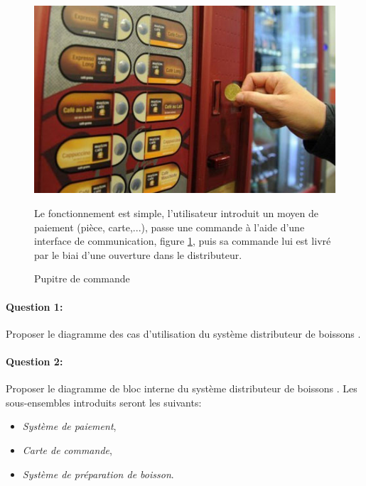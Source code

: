 \begin{figure}[htbp]
\begin{minipage}[c]{.40\linewidth}
\begin{center}
\includegraphics[width=0.9\linewidth]{img/piece.jpg}
\caption{Pupitre de commande}
\label{fig:image107}
\end{center}
\end{minipage}
\hfill
\begin{minipage}[c]{.55\linewidth}
Le fonctionnement est simple, l'utilisateur introduit un moyen de paiement (pièce, carte,...), passe une commande à l'aide d'une interface de communication, figure \ref{fig:image107}, puis sa commande lui est livré par le biai d'une ouverture dans le distributeur.
\end{minipage}
\end{figure}

\paragraph{Question 1:}

Proposer le diagramme des cas d'utilisation du système \og distributeur de boissons \fg.

\paragraph{Question 2:}

Proposer le diagramme de bloc interne du système \og distributeur de boissons \fg. Les sous-ensembles introduits seront les suivants:
\begin{itemize}
 \item \textit{Système de paiement},
 \item \textit{Carte de commande},
 \item \textit{Système de préparation de boisson}.
\end{itemize}

